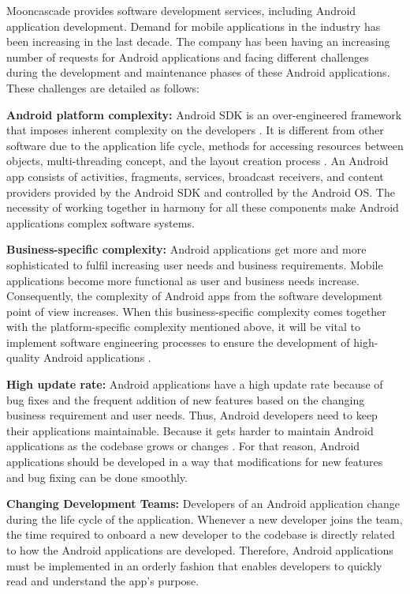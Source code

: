 Mooncascade provides software development services, including Android application development. Demand for mobile applications in the industry has been increasing in the last decade. The company has been having an increasing number of requests for Android applications and facing different challenges during the development and maintenance phases of these Android applications. These challenges are detailed as follows:

\noindent\textbf{Android platform complexity:} Android SDK is an over-engineered framework that imposes inherent complexity on the developers  \cite{56}. It is different from other software due to the application life cycle, methods for accessing resources between objects, multi-threading concept, and the layout creation process \cite{52}. An Android app consists of activities, fragments, services, broadcast receivers, and content providers provided by the Android SDK and controlled by the Android OS. The necessity of working together in harmony for all these components make Android applications complex software systems.

\noindent\textbf{Business-specific complexity:} Android applications get more and more sophisticated to fulfil increasing user needs and business requirements. Mobile applications become more functional as user and business needs increase. Consequently, the complexity of Android apps from the software development point of view increases. When this business-specific complexity comes together with the platform-specific complexity mentioned above, it will be vital to implement software engineering processes to ensure the development of high-quality Android applications \cite{2}. 

\noindent\textbf{High update rate:} Android applications have a high update rate \cite{3} because of bug fixes and the frequent addition of new features based on the changing business requirement and user needs. Thus, Android developers need to keep their applications maintainable. Because it gets harder to maintain Android applications as the codebase grows or changes \cite{34}. For that reason, Android applications should be developed in a way that modifications for new features and bug fixing can be done smoothly.

\noindent\textbf{Changing Development Teams:}  Developers of an Android application change during the life cycle of the application. Whenever a new developer joins the team, the time required to onboard a new developer to the codebase is directly related to how the Android applications are developed. Therefore, Android applications must be implemented in an orderly fashion that enables developers to quickly read and understand the app's purpose.

